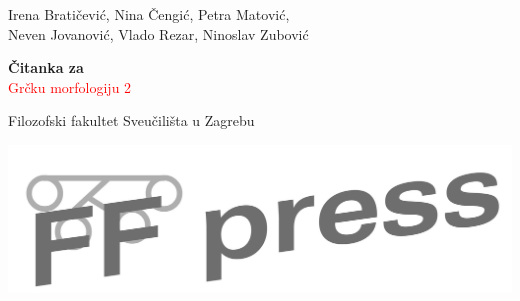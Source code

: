 \begin{titlepage} %

	\raggedleft %
	
	\vspace*{\baselineskip} %
	
	
	{\Large Irena Bratičević, Nina Čengić, Petra Matović,\\Neven Jovanović, Vlado Rezar, Ninoslav Zubović} %
	
	\vspace*{0.167\textheight} %
	
	
	\textbf{\LARGE Čitanka za}\\[\baselineskip] %
	
	{\textcolor{Red}{\Huge Grčku morfologiju 2}}\\[\baselineskip] %
	
	
	\vfill %
	
	
	{\large Filozofski fakultet Sveučilišta u Zagrebu
	
	\medskip
	
\includegraphics[scale=0.20]{ffpress-cb.png} %

}
	
	\vspace*{3\baselineskip} %

\end{titlepage}



